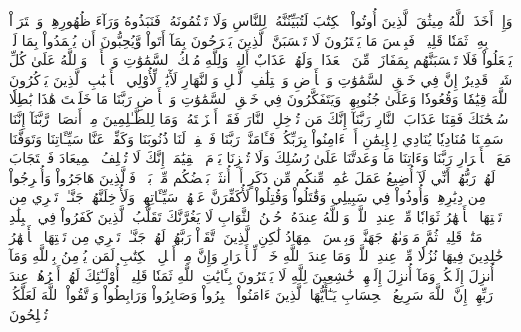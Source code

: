 وَإِذۡ أَخَذَ ٱللَّهُ مِيثَٰقَ ٱلَّذِينَ أُوتُواْ ٱلۡكِتَٰبَ لَتُبَيِّنُنَّهُۥ لِلنَّاسِ وَلَا تَكۡتُمُونَهُۥ فَنَبَذُوهُ وَرَآءَ ظُهُورِهِمۡ وَٱشۡتَرَوۡاْ بِهِۦ ثَمَنٗا قَلِيلٗاۖ فَبِئۡسَ مَا يَشۡتَرُونَ
لَا تَحۡسَبَنَّ ٱلَّذِينَ يَفۡرَحُونَ بِمَآ أَتَواْ وَّيُحِبُّونَ أَن يُحۡمَدُواْ بِمَا لَمۡ يَفۡعَلُواْ فَلَا تَحۡسَبَنَّهُم بِمَفَازَةٖ مِّنَ ٱلۡعَذَابِۖ وَلَهُمۡ عَذَابٌ أَلِيمٞ
وَلِلَّهِ مُلۡكُ ٱلسَّمَٰوَٰتِ وَٱلۡأَرۡضِۗ وَٱللَّهُ عَلَىٰ كُلِّ شَيۡءٖ قَدِيرٌ
إِنَّ فِي خَلۡقِ ٱلسَّمَٰوَٰتِ وَٱلۡأَرۡضِ وَٱخۡتِلَٰفِ ٱلَّيۡلِ وَٱلنَّهَارِ لَأٓيَٰتٖ لِّأُوْلِي ٱلۡأَلۡبَٰبِ
ٱلَّذِينَ يَذۡكُرُونَ ٱللَّهَ قِيَٰمٗا وَقُعُودٗا وَعَلَىٰ جُنُوبِهِمۡ وَيَتَفَكَّرُونَ فِي خَلۡقِ ٱلسَّمَٰوَٰتِ وَٱلۡأَرۡضِ رَبَّنَا مَا خَلَقۡتَ هَٰذَا بَٰطِلٗا سُبۡحَٰنَكَ فَقِنَا عَذَابَ ٱلنَّارِ
رَبَّنَآ إِنَّكَ مَن تُدۡخِلِ ٱلنَّارَ فَقَدۡ أَخۡزَيۡتَهُۥۖ وَمَا لِلظَّـٰلِمِينَ مِنۡ أَنصَارٖ
رَّبَّنَآ إِنَّنَا سَمِعۡنَا مُنَادِيٗا يُنَادِي لِلۡإِيمَٰنِ أَنۡ ءَامِنُواْ بِرَبِّكُمۡ فَـَٔامَنَّاۚ رَبَّنَا فَٱغۡفِرۡ لَنَا ذُنُوبَنَا وَكَفِّرۡ عَنَّا سَيِّـَٔاتِنَا وَتَوَفَّنَا مَعَ ٱلۡأَبۡرَارِ
رَبَّنَا وَءَاتِنَا مَا وَعَدتَّنَا عَلَىٰ رُسُلِكَ وَلَا تُخۡزِنَا يَوۡمَ ٱلۡقِيَٰمَةِۖ إِنَّكَ لَا تُخۡلِفُ ٱلۡمِيعَادَ
فَٱسۡتَجَابَ لَهُمۡ رَبُّهُمۡ أَنِّي لَآ أُضِيعُ عَمَلَ عَٰمِلٖ مِّنكُم مِّن ذَكَرٍ أَوۡ أُنثَىٰۖ بَعۡضُكُم مِّنۢ بَعۡضٖۖ فَٱلَّذِينَ هَاجَرُواْ وَأُخۡرِجُواْ مِن دِيَٰرِهِمۡ وَأُوذُواْ فِي سَبِيلِي وَقَٰتَلُواْ وَقُتِلُواْ لَأُكَفِّرَنَّ عَنۡهُمۡ سَيِّـَٔاتِهِمۡ وَلَأُدۡخِلَنَّهُمۡ جَنَّـٰتٖ تَجۡرِي مِن تَحۡتِهَا ٱلۡأَنۡهَٰرُ ثَوَابٗا مِّنۡ عِندِ ٱللَّهِۚ وَٱللَّهُ عِندَهُۥ حُسۡنُ ٱلثَّوَابِ
لَا يَغُرَّنَّكَ تَقَلُّبُ ٱلَّذِينَ كَفَرُواْ فِي ٱلۡبِلَٰدِ
مَتَٰعٞ قَلِيلٞ ثُمَّ مَأۡوَىٰهُمۡ جَهَنَّمُۖ وَبِئۡسَ ٱلۡمِهَادُ
لَٰكِنِ ٱلَّذِينَ ٱتَّقَوۡاْ رَبَّهُمۡ لَهُمۡ جَنَّـٰتٞ تَجۡرِي مِن تَحۡتِهَا ٱلۡأَنۡهَٰرُ خَٰلِدِينَ فِيهَا نُزُلٗا مِّنۡ عِندِ ٱللَّهِۗ وَمَا عِندَ ٱللَّهِ خَيۡرٞ لِّلۡأَبۡرَارِ
وَإِنَّ مِنۡ أَهۡلِ ٱلۡكِتَٰبِ لَمَن يُؤۡمِنُ بِٱللَّهِ وَمَآ أُنزِلَ إِلَيۡكُمۡ وَمَآ أُنزِلَ إِلَيۡهِمۡ خَٰشِعِينَ لِلَّهِ لَا يَشۡتَرُونَ بِـَٔايَٰتِ ٱللَّهِ ثَمَنٗا قَلِيلًاۚ أُوْلَـٰٓئِكَ لَهُمۡ أَجۡرُهُمۡ عِندَ رَبِّهِمۡۗ إِنَّ ٱللَّهَ سَرِيعُ ٱلۡحِسَابِ
يَـٰٓأَيُّهَا ٱلَّذِينَ ءَامَنُواْ ٱصۡبِرُواْ وَصَابِرُواْ وَرَابِطُواْ وَٱتَّقُواْ ٱللَّهَ لَعَلَّكُمۡ تُفۡلِحُونَ